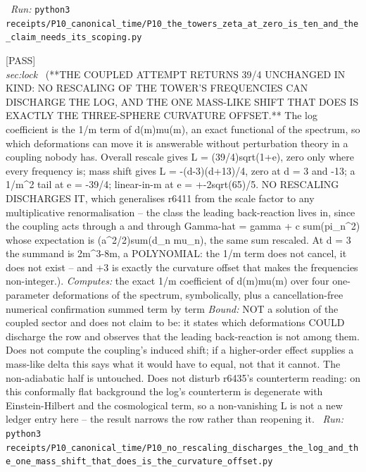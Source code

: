 \begin{description}
\ \emph{Run:} \texttt{python3 receipts/P10\_canonical\_time/P10\_the\_towers\_zeta\_at\_zero\_is\_ten\_and\_the\_claim\_needs\_its\_scoping.py}
\item[\rcptlabel{P10_no_rescaling_discharges_the_log_and_the_one_mass_shift_that_does_is_the_curvature_offset}{P10R17}\textbf{P10R17}\quad\texttt{P10\_no\_rescaling\_discharges\_the\_log\_and\_the\_one\_mass\_shift\_that\_does\_is\_the\_curvature\_offset}]\hfill\textsf{[PASS]}\\
\textit{sec:lock} \ (**THE COUPLED ATTEMPT RETURNS 39/4 UNCHANGED IN KIND: NO RESCALING OF THE TOWER'S FREQUENCIES CAN DISCHARGE THE LOG, AND THE ONE MASS-LIKE SHIFT THAT DOES IS EXACTLY THE THREE-SPHERE CURVATURE OFFSET.** The log coefficient is the 1/m term of d(m)mu(m), an exact functional of the spectrum, so which deformations can move it is answerable without perturbation theory in a coupling nobody has. Overall rescale gives L = (39/4)sqrt(1+e), zero only where every frequency is; mass shift gives L = -(d-3)(d+13)/4, zero at d = 3 and -13; a 1/m\textasciicircum{}2 tail at e = -39/4; linear-in-m at e = +-2sqrt(65)/5. NO RESCALING DISCHARGES IT, which generalises r6411 from the scale factor to any multiplicative renormalisation -- the class the leading back-reaction lives in, since the coupling acts through a and through Gamma-hat = gamma + c sum(pi\_n\textasciicircum{}2) whose expectation is (a\textasciicircum{}2/2)sum(d\_n mu\_n), the same sum rescaled. At d = 3 the summand is 2m\textasciicircum{}3-8m, a POLYNOMIAL: the 1/m term does not cancel, it does not exist -- and +3 is exactly the curvature offset that makes the frequencies non-integer.). 
\emph{Computes:} the exact 1/m coefficient of d(m)mu(m) over four one-parameter deformations of the spectrum, symbolically, plus a cancellation-free numerical confirmation summed term by term
 \emph{Bound:} NOT a solution of the coupled sector and does not claim to be: it states which deformations COULD discharge the row and observes that the leading back-reaction is not among them. Does not compute the coupling's induced shift; if a higher-order effect supplies a mass-like delta this says what it would have to equal, not that it cannot. The non-adiabatic half is untouched. Does not disturb r6435's counterterm reading: on this conformally flat background the log's counterterm is degenerate with Einstein-Hilbert and the cosmological term, so a non-vanishing L is not a new ledger entry here -- the result narrows the row rather than reopening it.
\ \emph{Run:} \texttt{python3 receipts/P10\_canonical\_time/P10\_no\_rescaling\_discharges\_the\_log\_and\_the\_one\_mass\_shift\_that\_does\_is\_the\_curvature\_offset.py}

\end{description}
